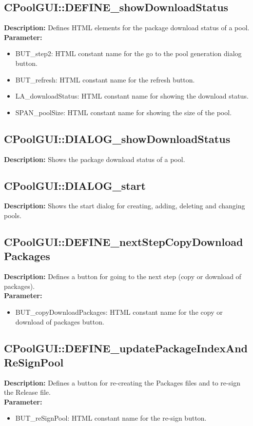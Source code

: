\subsection{CPoolGUI::DEFINE\_showDownloadStatus}
\textbf{Description:} Defines HTML elements for the package download status of a pool.\\
\textbf{Parameter:}
\begin{itemize}
\item BUT\_step2: HTML constant name for the go to the pool generation dialog button.
\item BUT\_refresh: HTML constant name for the refresh button.
\item LA\_downloadStatus: HTML constant name for showing the download status.
\item SPAN\_poolSize: HTML constant name for showing the size of the pool.
\end{itemize}

\subsection{CPoolGUI::DIALOG\_showDownloadStatus}
\textbf{Description:} Shows the package download status of a pool.\\

\subsection{CPoolGUI::DIALOG\_start}
\textbf{Description:} Shows the start dialog for creating, adding, deleting and changing pools.\\

\subsection{CPoolGUI::DEFINE\_nextStepCopyDownloadPackages}
\textbf{Description:} Defines a button for going to the next step (copy or download of packages).\\
\textbf{Parameter:}
\begin{itemize}
\item BUT\_copyDownloadPackages: HTML constant name for the copy or download of packages button.
\end{itemize}

\subsection{CPoolGUI::DEFINE\_updatePackageIndexAndReSignPool}
\textbf{Description:} Defines a button for re-creating the Packages files and to re-sign the Release file.\\
\textbf{Parameter:}
\begin{itemize}
\item BUT\_reSignPool: HTML constant name for the re-sign button.
\end{itemize}

